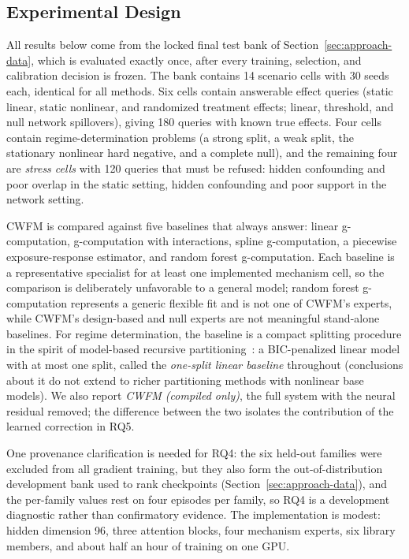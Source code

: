 \documentclass[electronics,article,submit,oneauthor]{Definitions/mdpi}
\begin{document}
\subsection{Experimental Design}\label{sec:assessment-design}

All results below come from the locked final test bank of Section~\ref{sec:approach-data}, which is evaluated exactly once, after every training, selection, and calibration decision is frozen. The bank contains 14 scenario cells with 30 seeds each, identical for all methods. Six cells contain answerable effect queries (static linear, static nonlinear, and randomized treatment effects; linear, threshold, and null network spillovers), giving 180 queries with known true effects. Four cells contain regime-determination problems (a strong split, a weak split, the stationary nonlinear hard negative, and a complete null), and the remaining four are \emph{stress cells} with 120 queries that must be refused: hidden confounding and poor overlap in the static setting, hidden confounding and poor support in the network setting.

CWFM is compared against five baselines that always answer: linear g-computation, g-computation with interactions, spline g-computation, a piecewise exposure-response estimator, and random forest g-computation. Each baseline is a representative specialist for at least one implemented mechanism cell, so the comparison is deliberately unfavorable to a general model; random forest g-computation represents a generic flexible fit and is not one of CWFM's experts, while CWFM's design-based and null experts are not meaningful stand-alone baselines. For regime determination, the baseline is a compact splitting procedure in the spirit of model-based recursive partitioning~\cite{zeileis2008mob}: a BIC-penalized linear model with at most one split, called the \emph{one-split linear baseline} throughout (conclusions about it do not extend to richer partitioning methods with nonlinear base models). We also report \emph{CWFM (compiled only)}, the full system with the neural residual removed; the difference between the two isolates the contribution of the learned correction in RQ5.

One provenance clarification is needed for RQ4: the six held-out families were excluded from all gradient training, but they also form the out-of-distribution development bank used to rank checkpoints (Section~\ref{sec:approach-data}), and the per-family values rest on four episodes per family, so RQ4 is a development diagnostic rather than confirmatory evidence. The implementation is modest: hidden dimension 96, three attention blocks, four mechanism experts, six library members, and about half an hour of training on one GPU.
\end{document}
